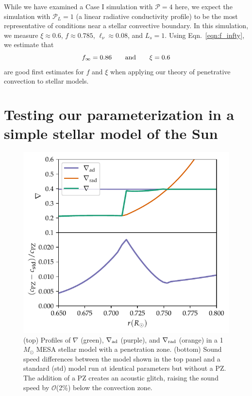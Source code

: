 \documentclass[twocolumn]{aastex631}
\newcommand{\gradrad}{\ensuremath{\nabla_{\rm{rad}}}}
\newcommand{\gradad}{\ensuremath{\nabla_{\rm{ad}}}}
\newcommand{\justgrad}{\ensuremath{\nabla}}
\newcommand{\mP}{\ensuremath{\mathcal{P}}}
\begin{document}
While we have examined a Case I simulation with $\mP = 4$ here, we expect the simulation with $\mP_L = 1$ (a linear radiative conductivity profile) to be the most representative of conditions near a stellar convective boundary.
In this simulation, we measure $\xi \approx 0.6$, $f \approx 0.785$, $\ell_\nu \approx 0.08$, and $L_s = 1$.
Using Eqn.~\ref{eqn:f_infty}, we estimate that
\begin{equation}
f_\infty = 0.86\qquad\rm{and}\qquad
\xi = 0.6
\label{eqn:f_xi_estimates}
\end{equation}
are good first estimates for $f$ and $\xi$ when applying our theory of penetrative convection to stellar models.

\section{Testing our parameterization in a simple stellar model of the Sun}
\label{sec:solar_model}

\begin{figure}[t]
\centering
\includegraphics[width=\columnwidth]{mesa_profiles.pdf}
\caption{
(top) Profiles of $\justgrad$ (green), $\gradad$ (purple), and $\gradrad$ (orange) in a 1 $M_\odot$ MESA stellar model with a penetration zone.
(bottom) Sound speed differences between the model shown in the top panel and a standard (std) model run at identical parameters but without a PZ.
The addition of a PZ creates an acoustic glitch, raising the sound speed by $\mathcal{O}$(2\%) below the convection zone.
\label{fig:mesa_profiles}
}
\end{figure}
\end{document}
